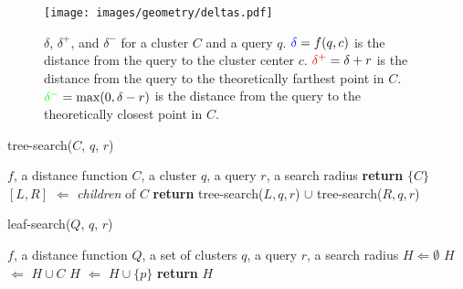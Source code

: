 \begin{figure}[t]
    \vskip -0.2in
    \centering
    \texttt{[image: images/geometry/deltas.pdf]}
    \vskip -0.1in
    \caption{
        {\color{blue}$\delta$}, {\color{red}$\delta^{+}$}, and {\color{green}$\delta^{-}$} for a cluster $C$ and a query $q$.
        ${\color{blue}\delta} = f(q, c)$ is the distance from the query to the cluster center $c$.
        ${\color{red}\delta^{+}} = \delta + r$ is the distance from the query to the theoretically farthest point in $C$.
        ${\color{green}\delta^{-}} = \text{max}(0, \delta - r)$ is the distance from the query to the theoretically closest point in $C$.
    }
    \label{fig:methods:deltas}
\end{figure}
\FloatBarrier

\FloatBarrier
    \begin{algorithm}[!t]
        \caption{tree-search($C$, $q$, $r$)}
        \label{alg:methods:rnn-search:tree-search}
        \begin{algorithmic}[1]
            \REQUIRE $f$, a distance function
            \REQUIRE $C$, a cluster
            \REQUIRE $q$, a query
            \REQUIRE $r$, a search radius
                \STATE \textbf{return} $\{C\}$
            \ELSE
                \STATE $[L, R]$ $\Leftarrow$ \textit{children} of $C$
                \STATE \textbf{return} tree-search($L, q, r$) $\cup$ tree-search($R, q, r$)
            \ENDIF
        \end{algorithmic}
    \end{algorithm}

    \begin{algorithm}[!t]
        \caption{leaf-search($Q$, $q$, $r$)}
        \label{alg:methods:rnn-search:leaf-search}
        \begin{algorithmic}[1]
            \REQUIRE $f$, a distance function
            \REQUIRE $Q$, a set of clusters
            \REQUIRE $q$, a query
            \REQUIRE $r$, a search radius
            \STATE $H \Leftarrow \emptyset$
                    \STATE $H$ $\Leftarrow$ $H \cup C$
                \ELSE
                            \STATE $H$ $\Leftarrow$ $H \cup \{p\}$
                        \ENDIF
                    \ENDFOR
                \ENDIF
            \ENDFOR
            \STATE \textbf{return} $H$
        \end{algorithmic}
    \end{algorithm}


